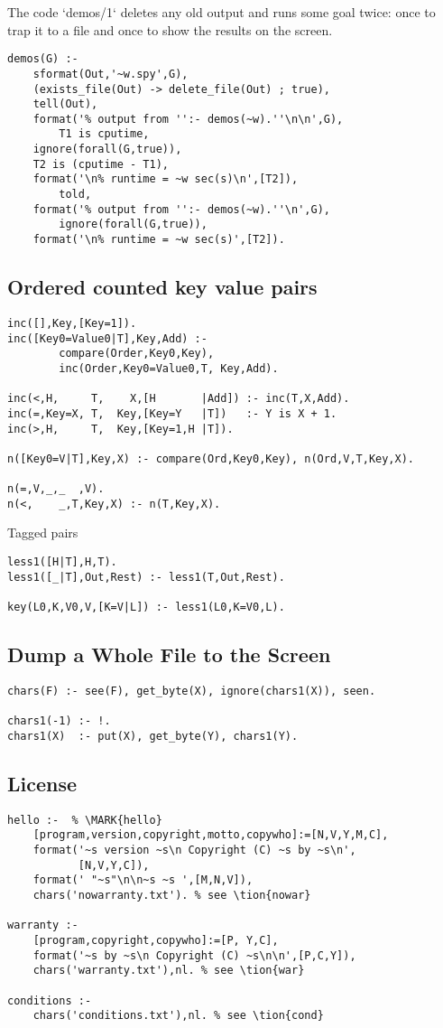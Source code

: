 \documentclass[twocolumn,10pt]{book}
\begin{document}
The code `demos/1` deletes any old output and runs some goal twice: once
to trap it to a file and once to show the results on the screen.  \begin{Verbatim}
demos(G) :-
    sformat(Out,'~w.spy',G),
    (exists_file(Out) -> delete_file(Out) ; true),
    tell(Out),
    format('% output from '':- demos(~w).''\n\n',G),
        T1 is cputime,
    ignore(forall(G,true)),
    T2 is (cputime - T1),
    format('\n% runtime = ~w sec(s)\n',[T2]),
        told,
    format('% output from '':- demos(~w).''\n',G),
        ignore(forall(G,true)),
    format('\n% runtime = ~w sec(s)',[T2]).
\end{Verbatim}
\subsection{ Ordered counted key value pairs
}
\begin{Verbatim}
inc([],Key,[Key=1]).
inc([Key0=Value0|T],Key,Add) :-
        compare(Order,Key0,Key),
        inc(Order,Key0=Value0,T, Key,Add).

inc(<,H,     T,    X,[H       |Add]) :- inc(T,X,Add).
inc(=,Key=X, T,  Key,[Key=Y   |T])   :- Y is X + 1.
inc(>,H,     T,  Key,[Key=1,H |T]).

n([Key0=V|T],Key,X) :- compare(Ord,Key0,Key), n(Ord,V,T,Key,X).

n(=,V,_,_  ,V).
n(<,    _,T,Key,X) :- n(T,Key,X).
\end{Verbatim}
 Tagged pairs  \begin{Verbatim}
less1([H|T],H,T).
less1([_|T],Out,Rest) :- less1(T,Out,Rest).

key(L0,K,V0,V,[K=V|L]) :- less1(L0,K=V0,L).
\end{Verbatim}
\subsection{ Dump a Whole File to the Screen}\begin{Verbatim}
chars(F) :- see(F), get_byte(X), ignore(chars1(X)), seen.

chars1(-1) :- !.
chars1(X)  :- put(X), get_byte(Y), chars1(Y).
\end{Verbatim}
\subsection{ License }\begin{Verbatim}
hello :-  % \MARK{hello}
    [program,version,copyright,motto,copywho]:=[N,V,Y,M,C],
    format('~s version ~s\n Copyright (C) ~s by ~s\n',
           [N,V,Y,C]),
    format(' "~s"\n\n~s ~s ',[M,N,V]),
    chars('nowarranty.txt'). % see \tion{nowar}

warranty :-
    [program,copyright,copywho]:=[P, Y,C],
    format('~s by ~s\n Copyright (C) ~s\n\n',[P,C,Y]),
    chars('warranty.txt'),nl. % see \tion{war}

conditions :-
    chars('conditions.txt'),nl. % see \tion{cond}
\end{Verbatim}
\end{document}
